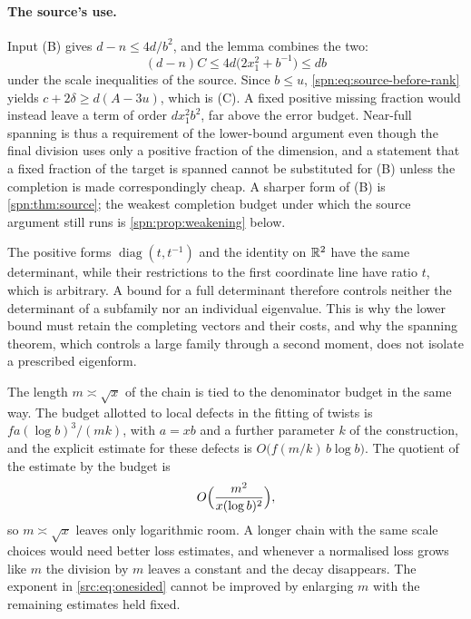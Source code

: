 \paragraph{The source's use.}
Input (B) gives $d-n\le4d/b^2$, and the lemma  combines the two:
\[
(d-n)C\le4d\bigl(2x_1^2+b^{-1}\bigr)\le db
\]
under the scale inequalities of the source. Since $b\le u$, \eqref{spn:eq:source-before-rank}
yields $c+2\delta\ge d(A-3u)$, which is (C). A fixed positive missing fraction would instead
leave a term of order $dx_1^2b^2$, far above the error budget. Near-full spanning is thus a
requirement of the lower-bound argument even though the final division uses only a positive
fraction of the dimension, and a statement that a fixed fraction of the target is spanned
cannot be substituted for (B) unless the completion is made correspondingly cheap. A sharper
form of (B) is \cref{spn:thm:source}; the weakest completion budget under which the source
argument still runs is \cref{spn:prop:weakening} below.

\begin{example}\label{src:ex:diag}
The positive forms $\operatorname{diag}(t,t^{-1})$ and the identity on $\mathbb{R}^2$ have the same
determinant, while their restrictions to the first coordinate line have ratio $t$, which is
arbitrary. A bound for a full determinant therefore controls neither the determinant of a
subfamily nor an individual eigenvalue. This is why the lower bound must retain the completing
vectors and their costs, and why the spanning theorem, which controls a large family through
a second moment, does not isolate a prescribed eigenform.
\end{example}

The length $m\asymp\sqrt x$ of the chain is tied to the denominator budget in the same way.
The budget allotted to local defects in the fitting of twists is $fa(\log b)^3/(mk)$, with
$a=xb$ and a further parameter $k$ of the construction, and the explicit estimate for these
defects is $O\bigl(f(m/k)\,b\log b\bigr)$. The quotient of the estimate by the budget is
\begin{equation}\label{src:eq:budget-ratio}
O\Bigl(\frac{m^2}{x(\log b)^2}\Bigr),
\end{equation}
so $m\asymp\sqrt x$ leaves only logarithmic room. A longer chain with the same scale choices
would need better loss estimates, and whenever a normalised loss grows like $m$ the division
by $m$ leaves a constant and the decay disappears. The exponent in \eqref{src:eq:onesided}
cannot be improved by enlarging $m$ with the remaining estimates held fixed.

